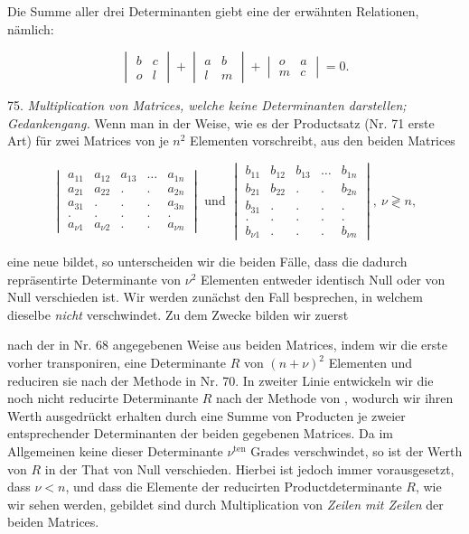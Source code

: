 \documentclass[11pt]{article}
\providecommand{\gesperrt}[1]{\textls[130]{#1}}
\providecommand{\weberpage}[1]{}
\begin{document}
Die Summe aller drei Determinanten giebt eine der erwähnten Relationen, nämlich:

\[
\begin{vmatrix} b & c\\ o & l\end{vmatrix} + \begin{vmatrix} a & b\\ l & m\end{vmatrix} + \begin{vmatrix} o & a\\ m & c\end{vmatrix} = 0.
\]

75. \textit{Multiplication von Matrices, welche keine Determinanten darstellen; Gedankengang.} Wenn man in der Weise, wie es der Productsatz (Nr. 71 erste Art) für zwei Matrices von je $n^2$ Elementen vorschreibt, aus den beiden Matrices

\[
\begin{vmatrix}
a_{11} & a_{12} & a_{13} & \ldots & a_{1n}\\
a_{21} & a_{22} & . & . & a_{2n}\\
a_{31} & . & . & . & a_{3n}\\
. & . & . & . & .\\
a_{\nu 1} & a_{\nu 2} & . & . & a_{\nu n}
\end{vmatrix}
\text{ und }
\begin{vmatrix}
b_{11} & b_{12} & b_{13} & \ldots & b_{1n}\\
b_{21} & b_{22} & . & . & b_{2n}\\
b_{31} & . & . & . & .\\
. & . & . & . & .\\
b_{\nu 1} & . & . & . & b_{\nu n}
\end{vmatrix},\ \nu \gtrless n,
\]

eine neue bildet, so unterscheiden wir die beiden Fälle, dass die dadurch repräsentirte Determinante von $\nu^2$ Elementen entweder identisch Null oder von Null verschieden ist. Wir werden zunächst den Fall besprechen, in welchem dieselbe \textit{nicht} verschwindet. Zu dem Zwecke bilden wir zuerst


\weberpage{80}

nach der in Nr. 68 angegebenen Weise aus beiden Matrices, indem wir die erste vorher transponiren, eine Determinante $R$ von $(n+\nu)^2$ Elementen und reduciren sie nach der Methode in Nr. 70. In zweiter Linie entwickeln wir die noch nicht reducirte Determinante $R$ nach der Methode von \gesperrt{Laplace}, wodurch wir ihren Werth ausgedrückt erhalten durch eine Summe von Producten je zweier entsprechender Determinanten der beiden gegebenen Matrices. Da im Allgemeinen keine dieser Determinante $\nu^{\mathrm{ten}}$ Grades verschwindet, so ist der Werth von $R$ in der That von Null verschieden. Hierbei ist jedoch immer vorausgesetzt, dass $\nu < n$, und dass die Elemente der reducirten Productdeterminante $R$, wie wir sehen werden, gebildet sind durch Multiplication von \textit{Zeilen mit Zeilen} der beiden Matrices.
\end{document}
